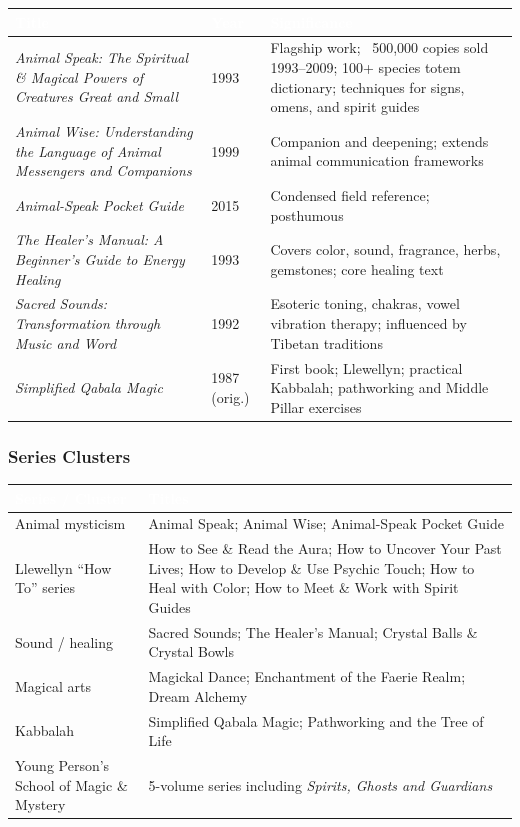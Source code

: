 \documentclass[11pt,letterpaper]{article}
\newcommand{\tableheader}[1]{\textbf{\sffamily\textcolor{white}{#1}}}
\begin{document}
\begin{center}
\begin{tabularx}{\textwidth}{L{4.5cm}C{1.2cm}X}
\toprule
{}
\tableheader{Title} & \tableheader{Year} & \tableheader{Significance} \\
\midrule
\emph{Animal Speak: The Spiritual \& Magical Powers of Creatures Great and Small} & 1993 & Flagship work; ~500,000 copies sold 1993--2009; 100+ species totem dictionary; techniques for signs, omens, and spirit guides \\
\emph{Animal Wise: Understanding the Language of Animal Messengers and Companions} & 1999 & Companion and deepening; extends animal communication frameworks \\
\emph{Animal-Speak Pocket Guide} & 2015 & Condensed field reference; posthumous \\
\emph{The Healer's Manual: A Beginner's Guide to Energy Healing} & 1993 & Covers color, sound, fragrance, herbs, gemstones; core healing text \\
\emph{Sacred Sounds: Transformation through Music and Word} & 1992 & Esoteric toning, chakras, vowel vibration therapy; influenced by Tibetan traditions \\
\emph{Simplified Qabala Magic} & 1987 (orig.) & First book; Llewellyn; practical Kabbalah; pathworking and Middle Pillar exercises \\
\bottomrule
\end{tabularx}
\end{center}

\subsubsection{Series Clusters}

\begin{center}
\begin{tabularx}{\textwidth}{L{4cm}X}
\toprule
{}
\tableheader{Series / Cluster} & \tableheader{Titles} \\
\midrule
Animal mysticism & Animal Speak; Animal Wise; Animal-Speak Pocket Guide \\
Llewellyn ``How To'' series & How to See \& Read the Aura; How to Uncover Your Past Lives; How to Develop \& Use Psychic Touch; How to Heal with Color; How to Meet \& Work with Spirit Guides \\
Sound / healing & Sacred Sounds; The Healer's Manual; Crystal Balls \& Crystal Bowls \\
Magical arts & Magickal Dance; Enchantment of the Faerie Realm; Dream Alchemy \\
Kabbalah & Simplified Qabala Magic; Pathworking and the Tree of Life \\
Young Person's School of Magic \& Mystery & 5-volume series including \emph{Spirits, Ghosts and Guardians} \\
\bottomrule
\end{tabularx}
\end{center}
\end{document}

